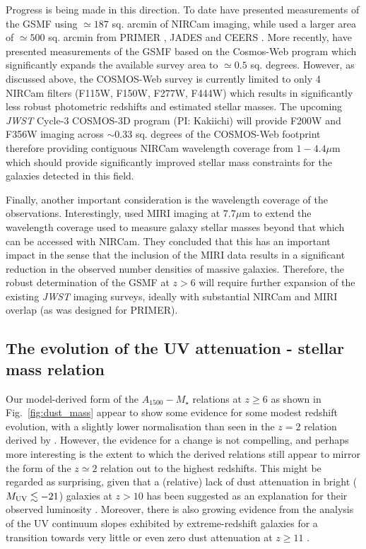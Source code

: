 \documentclass[fleqn,usenatbib]{mnras}
\begin{document}
Progress is being made in this direction. To date \citet{harvey2024} have presented measurements of the GSMF using $\simeq187$ sq. arcmin of NIRCam imaging, while  \citet{weibel2024} used a larger area of $\simeq500$ sq. arcmin from PRIMER \citep{dunlop2021}, JADES \citep{eisenstein2023} and CEERS \citep{bagley2023}. More recently, \citet{shuntov2024}
have presented measurements of the GSMF based on the Cosmos-Web program \citep{caset2023b} which significantly expands the available survey area to $\simeq 0.5$ sq. degrees.
However, as discussed above, the COSMOS-Web survey is currently limited to only 4 NIRCam filters (F115W, F150W, F277W, F444W) which results in significantly less robust photometric redshifts and estimated stellar masses. The upcoming {\it JWST} Cycle-3 COSMOS-3D program (PI: Kakiichi) will provide F200W and F356W imaging across $\sim0.33$ sq. degrees of the COSMOS-Web footprint therefore providing contiguous NIRCam wavelength coverage from $1-4.4 \mu$m which should provide significantly improved stellar mass constraints for the galaxies detected in this field. 

Finally, another important consideration is the wavelength coverage of the observations.  Interestingly, \citet{wang2024} used MIRI imaging at $7.7\mu$m to extend the wavelength coverage used to measure galaxy stellar masses beyond that which can be accessed with NIRCam. They concluded that this has an important impact in the sense that the inclusion of the MIRI data results in a significant reduction in the observed number densities of massive galaxies. Therefore, the robust determination of the GSMF at $z>6$ will require further expansion of the existing  {\it JWST} imaging surveys, ideally with substantial NIRCam and MIRI overlap (as was designed for PRIMER).

\subsection{The evolution of the UV attenuation - stellar mass relation}
\label{sec:dust_discussion}
Our model-derived form of the $A_{1500}-M_{\star}$ relations at $z\geq6$ as shown in Fig.~\ref{fig:dust_mass} appear to show some evidence for some modest redshift evolution, with a slightly lower normalisation than seen in the $z=2$ relation derived by \citet{mclure2018}. However, the evidence for a change is not compelling, and perhaps more interesting is the extent to which the derived relations still appear to mirror the form of the $z \simeq 2$ relation out to the highest redshifts. This might be regarded as surprising, given that a (relative) lack of dust attenuation in bright ($M_{\rm UV}\lesssim-21$) galaxies at $z>10$ has been suggested as an explanation for their observed luminosity \citep[e.g.][]{ferrara2023}. Moreover, there is also growing evidence from the analysis of the UV continuum slopes exhibited by extreme-redshift galaxies for a transition towards very little or even zero dust attenuation at $z \geq  11$ \citep[e.g.][]{topping2023,morales2023,cullen2023}. 
\end{document}
